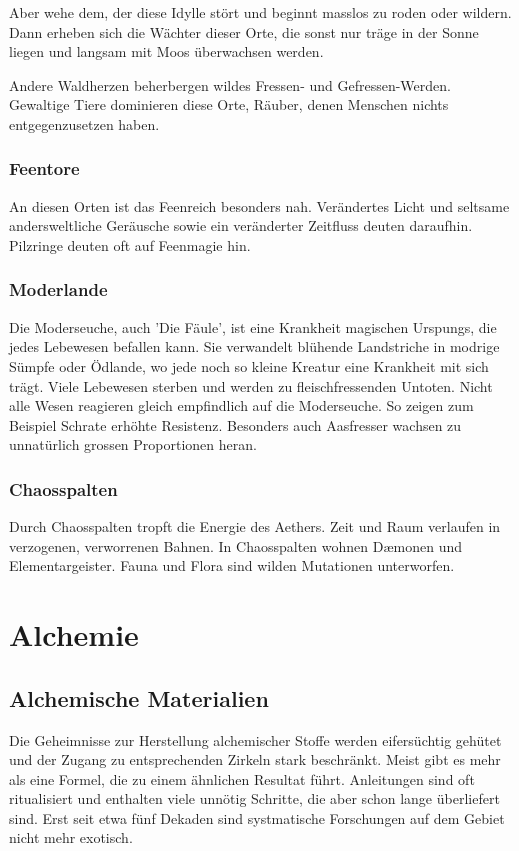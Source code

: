 \documentclass[12pt,twoside,twocolumn,openany]{book}
\begin{document}
Aber wehe dem, der diese Idylle stört und beginnt masslos zu roden oder wildern. Dann erheben sich die Wächter dieser Orte, die sonst nur träge in der Sonne liegen und langsam mit Moos überwachsen werden.

Andere Waldherzen beherbergen wildes Fressen- und Gefressen-Werden. Gewaltige Tiere dominieren diese Orte, Räuber, denen Menschen nichts entgegenzusetzen haben.


\subsubsection{Feentore}
An diesen Orten ist das Feenreich besonders nah. Verändertes Licht und seltsame andersweltliche Geräusche sowie ein veränderter Zeitfluss deuten daraufhin. Pilzringe deuten oft auf Feenmagie hin.


\subsubsection{Moderlande}
Die Moderseuche, auch 'Die Fäule', ist eine Krankheit magischen Urspungs, die jedes Lebewesen befallen kann. Sie verwandelt blühende Landstriche in modrige Sümpfe oder Ödlande, wo jede noch so kleine Kreatur eine Krankheit mit sich trägt. Viele Lebewesen sterben und werden zu fleischfressenden Untoten.
Nicht alle Wesen reagieren gleich empfindlich auf die Moderseuche. So zeigen zum Beispiel Schrate erhöhte Resistenz. Besonders auch Aasfresser wachsen zu unnatürlich grossen Proportionen heran.


\subsubsection{Chaosspalten}
Durch Chaosspalten tropft die Energie des Aethers. Zeit und Raum verlaufen in verzogenen, verworrenen Bahnen. In Chaosspalten wohnen D\ae monen und Elementargeister. Fauna und Flora sind wilden Mutationen unterworfen.



\section{Alchemie}
\subsection*{Alchemische Materialien}
Die Geheimnisse zur Herstellung alchemischer Stoffe werden eifersüchtig gehütet und der Zugang zu entsprechenden Zirkeln stark beschränkt. Meist gibt es mehr als eine Formel, die zu einem ähnlichen Resultat führt. Anleitungen sind oft ritualisiert und enthalten viele unnötig Schritte, die aber schon lange überliefert sind. Erst seit etwa fünf Dekaden sind systmatische Forschungen auf dem Gebiet nicht mehr exotisch.
\end{document}
